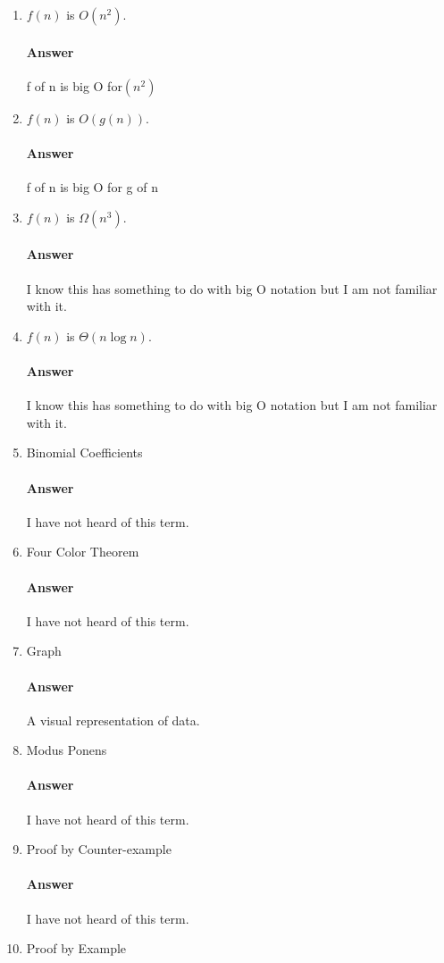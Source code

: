 \documentclass{article}
\begin{document}
\begin{enumerate}
    \item $f(n)$ is $O(n^2)$.
        \paragraph{Answer}
    f of n is big O for$( n^2)$
    \item $f(n)$ is $O(g(n))$.
        \paragraph{Answer}
     f of n is big O for g of n
    \item $f(n)$ is $\Omega(n^3)$.
        \paragraph{Answer}
        I know this has something to do with big O notation but I am not familiar with it.
    \item $f(n)$ is $\Theta(n\log n)$.
        \paragraph{Answer}
          I know this has something to do with big O notation but I am not familiar with it.
    \item Binomial Coefficients
      \paragraph {Answer}
        I have not heard of this term.
    \item Four Color Theorem
      \paragraph {Answer}
         I have not heard of this term.
    \item Graph
        \paragraph{Answer}
        A visual representation of data.
    \item Modus Ponens
        \paragraph{Answer}
         I have not heard of this term.
    \item Proof by Counter-example
        \paragraph{Answer}
         I have not heard of this term.
    \item Proof by Example

\end{enumerate}
\end{document}
